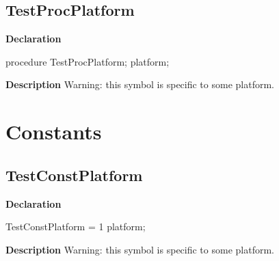 \documentclass{report}
\begin{document}
\subsection*{TestProcPlatform}
\begin{list}{}{
\setlength{\itemindent}{0cm}
\setlength{\listparindent}{0cm}
\setlength{\leftmargin}{\evensidemargin}
\addtolength{\leftmargin}{\tmplength}
\settowidth{\labelsep}{X}
\addtolength{\leftmargin}{\labelsep}
\setlength{\labelwidth}{\tmplength}
}
\begin{flushleft}
\item[\textbf{Declaration}\hfill]
\begin{ttfamily}
procedure TestProcPlatform; platform;\end{ttfamily}


\end{flushleft}
\par
\item[\textbf{Description}]
Warning: this symbol is specific to some platform.

 

\end{list}
\section{Constants}
\subsection*{TestConstPlatform}
\begin{list}{}{
\setlength{\itemindent}{0cm}
\setlength{\listparindent}{0cm}
\setlength{\leftmargin}{\evensidemargin}
\addtolength{\leftmargin}{\tmplength}
\settowidth{\labelsep}{X}
\addtolength{\leftmargin}{\labelsep}
\setlength{\labelwidth}{\tmplength}
}
\begin{flushleft}
\item[\textbf{Declaration}\hfill]
\begin{ttfamily}
TestConstPlatform = 1 platform;\end{ttfamily}


\end{flushleft}
\par
\item[\textbf{Description}]
Warning: this symbol is specific to some platform.

 

\end{list}
\end{document}
